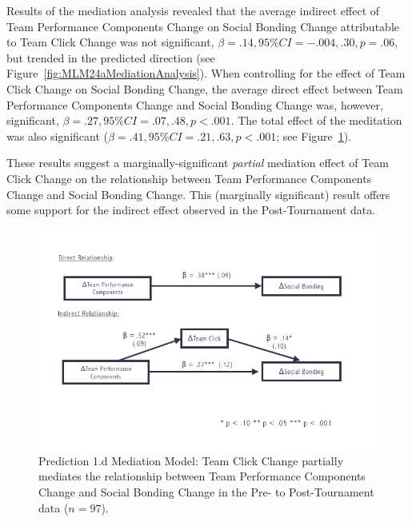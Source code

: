 \begin{CJK}{UTF8}{gbsn}
  Results of the mediation analysis revealed that the average indirect effect of Team Performance Components Change on Social Bonding Change attributable to Team Click Change was not significant, $\beta = .14, 95\% CI = -.004 , .30, p = .06$, but trended in the predicted direction (see Figure~\ref{fig:MLM24aMediationAnalysis}).  When controlling for the effect of Team Click Change on Social Bonding Change, the average direct effect between Team Performance Components Change and Social Bonding Change was, however, significant, $\beta = .27, 95\% CI = .07 , .48, p < .001$.  The total effect of the meditation was also significant ($\beta = .41, 95\% CI = .21 , .63, p < .001$; see Figure~\ref{fig:tournamentSurveyMedPrePost}).

  These results suggest a marginally-significant \textit{partial} mediation effect of Team Click Change on the relationship between Team Performance Components Change and Social Bonding Change.  This (marginally significant) result offers some support for the indirect effect observed in the Post-Tournament data.





  \begin{figure}
    \centering
    \includegraphics[width=0.9\linewidth,keepaspectratio] {images/tournamentSurveyMedPrePost}
    \caption{Prediction 1.d Mediation Model: Team Click Change partially mediates the relationship between Team Performance Components Change and Social Bonding Change in the Pre- to Post-Tournament data ($n = 97$).}
    \label{fig:tournamentSurveyMedPrePost}
  \end{figure}




\end{CJK}
